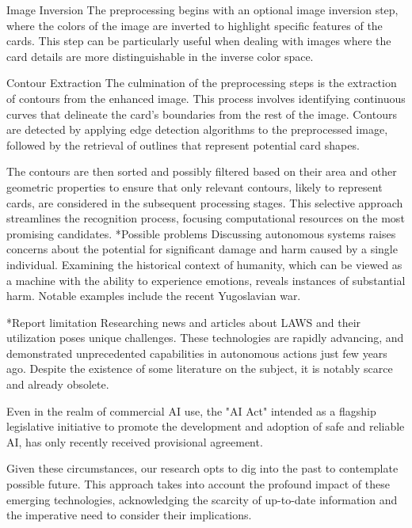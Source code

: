 \documentclass[twocolumn, a4paper,10pt]{article}
\makeatletter
\renewcommand\section{\@startsection{section}{1}{\z@}{3pt}{3pt}{\normalfont\large\bfseries}}
\renewcommand\subsection{\@startsection{subsection}{1}{\z@}{\z@}{\z@}{\normalfont\normalsize\bfseries}}
\renewcommand\subsection{\@startsection{subsection}{1}{\z@}{\z@}{0.1pt}{\normalfont\normalsize\bfseries}}
\makeatother
\begin{document}
Image Inversion
The preprocessing begins with an optional image inversion step, where the colors of the image are inverted to highlight specific features of the cards. This step can be particularly useful when dealing with images where the card details are more distinguishable in the inverse color space.

Contour Extraction
The culmination of the preprocessing steps is the extraction of contours from the enhanced image. This process involves identifying continuous curves that delineate the card's boundaries from the rest of the image. Contours are detected by applying edge detection algorithms to the preprocessed image, followed by the retrieval of outlines that represent potential card shapes.

The contours are then sorted and possibly filtered based on their area and other geometric properties to ensure that only relevant contours, likely to represent cards, are considered in the subsequent processing stages. This selective approach streamlines the recognition process, focusing computational resources on the most promising candidates.
\subsection*{Possible problems}
Discussing autonomous systems raises concerns about the potential for significant damage and harm caused by a single individual. Examining the historical context of humanity, which can be viewed as a machine with the ability to experience emotions, reveals instances of substantial harm. Notable examples include the recent Yugoslavian war.

\section*{Report limitation}
Researching news and articles about LAWS and their utilization poses unique challenges. These technologies are rapidly advancing, and demonstrated unprecedented capabilities in autonomous actions just few years ago. Despite the existence of some literature on the subject, it is notably scarce and already obsolete.

Even in the realm of commercial AI use, the "AI Act" intended as a flagship legislative initiative to promote the development and adoption of safe and reliable AI, has only recently received provisional agreement.

Given these circumstances, our research opts to dig into the past to contemplate possible future. This approach takes into account the profound impact of these emerging technologies, acknowledging the scarcity of up-to-date information and the imperative need to consider their implications.
\end{document}
